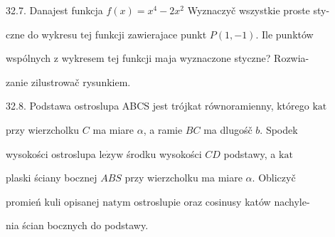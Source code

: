 \documentclass[a4paper,12pt]{article}
\begin{document}
32.7. Danajest funkcja $f(x)=x^{4}-2x^{2}$ Wyznaczyč wszystkie proste sty-

czne do wykresu $\mathrm{t}\mathrm{e}\mathrm{j}$ funkcji zawierajace punkt $P(1,-1)$. Ile punktów

wspólnych $\mathrm{z}$ wykresem $\mathrm{t}\mathrm{e}\mathrm{j}$ funkcji maja wyznaczone styczne? Rozwia-

zanie zilustrowač rysunkiem.

32.8. Podstawa ostroslupa ABCS jest trójkat równoramienny, którego $\mathrm{k}\mathrm{a}\mathrm{t}$

przy wierzcholku $C$ ma miare $\alpha$, a ramie $BC$ ma dlugośč $b$. Spodek

wysokości ostroslupa $\mathrm{l}\mathrm{e}\dot{\mathrm{z}}\mathrm{y}\mathrm{w}$ środku wysokości $CD$ podstawy, a $\mathrm{k}\mathrm{a}\mathrm{t}$

plaski ściany bocznej $ABS$ przy wierzcholku ma miare $\alpha$. Obliczyč

promień kuli opisanej $\mathrm{n}\mathrm{a}\mathrm{t}\mathrm{y}\mathrm{m}$ ostroslupie oraz cosinusy katów nachyle-

nia ścian bocznych do podstawy.
\end{document}

